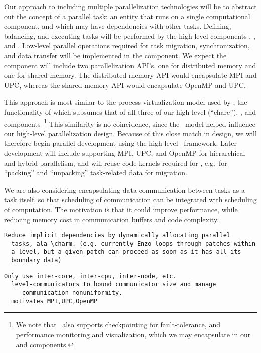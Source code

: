 \documentclass[10pt]{article}
\begin{document}
Our approach to including multiple parallelization technologies will
be to abstract out the concept of a parallel task: an entity that runs
on a single computational component, and which may have dependencies
with other tasks.  Defining, balancing, and executing tasks will be
performed by the high-level components , ,
and .  Low-level parallel operations required for task
migration, synchronization, and data transfer will be implemented in
the  component.  We expect the component will include
two parallelization API's, one for distributed memory and one for
shared memory.  The distributed memory API would encapsulate MPI and
UPC, whereas the shared memory API would encapsulate OpenMP and UPC.

This approach is most similar to the process virtualization model used
by \charm, the functionality of which subsumes that of all three of
our high level  (``chare''), , and
 components~\footnote{We note that \charm\ also
  supports checkpointing for fault-tolerance, and performance
  monitoring and visualization, which we may encapsulate in our
   and  components.}  This similarity is
no coincidence, since the \charm\ model helped influence our
high-level parallelization design.  Because of this close match in
design, we will therefore begin parallel development using the
high-level \charm\ framework.  Later development will include
supporting MPI, UPC, and OpenMP for hierarchical and hybrid
parallelism, and will reuse code kernels required for \charm, e.g.~for
``packing'' and ``unpacking'' task-related data for migration.

We are also considering encapsulating data communication between tasks
as a task itself, so that scheduling of communication can be
integrated with scheduling of computation.  The motivation is that it
could improve performance, while reducing memory cost in communication
buffers and code complexity.

\begin{verbatim}
Reduce implicit dependencies by dynamically allocating parallel
  tasks, ala \charm. (e.g. currently Enzo loops through patches within
  a level, but a given patch can proceed as soon as it has all its
  boundary data)
\end{verbatim}

\begin{verbatim}
Only use inter-core, inter-cpu, inter-node, etc.
  level-communicators to bound communicator size and manage
     communication nonuniformity.
  motivates MPI,UPC,OpenMP
\end{verbatim}
\end{document}
